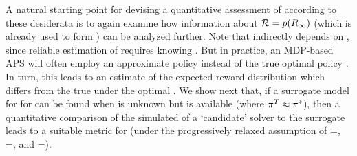     
 A natural starting point for devising a quantitative assessment of \xQ{} according to these desiderata is to again examine how information about $\mathcal{R}=p(R_{\infty})$ (which is already used to form \xO{}) can be analyzed further. 
 Note that \xO{} indirectly depends on \xQ{}, since reliable estimation of \rwd{} requires knowing \piopt. But in practice, an MDP-based APS will often employ an approximate policy \piapprox{} instead of the true optimal policy \piopt. In turn, this leads to an estimate \ppiapproxri{} of the expected reward distribution which differs from the true \ppioptri{} under the optimal \piopt. We show next that, if a surrogate model for \rwdpredicted{} for \rwdtrust{} can be found when \piopt{} is unknown but \pitrust{} is available (where $\pi^T \approx \pi^*$), then a quantitative comparison of the simulated \rwdcandsim{} of a `candidate' solver to the surrogate \rwdpredicted{} leads to a suitable metric for \xQ{} (under the progressively relaxed assumption of \xM{}=\xMup, \xP{}=\xPup, and \xI{}=\xIup). 
    
    
